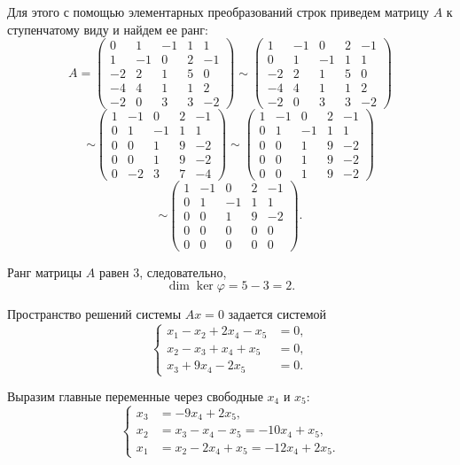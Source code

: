 Для этого с помощью элементарных преобразований строк приведем матрицу $A$ к ступенчатому виду и найдем ее ранг:
\[
A=
\begin{pmatrix}
0 & 1 & -1 & 1 & 1\\
1 & -1 & 0 & 2 & -1\\
-2 & 2 & 1 & 5 & 0\\
-4 & 4 & 1 & 1 & 2\\
-2 & 0 & 3 & 3 & -2
\end{pmatrix}
\sim
\begin{pmatrix}
1 & -1 & 0 & 2 & -1\\
0 & 1 & -1 & 1 & 1\\
-2 & 2 & 1 & 5 & 0\\
-4 & 4 & 1 & 1 & 2\\
-2 & 0 & 3 & 3 & -2
\end{pmatrix}
\]
\[
\sim
\begin{pmatrix}
1 & -1 & 0 & 2 & -1\\
0 & 1 & -1 & 1 & 1\\
0 & 0 & 1 & 9 & -2\\
0 & 0 & 1 & 9 & -2\\
0 & -2 & 3 & 7 & -4
\end{pmatrix}
\sim
\begin{pmatrix}
1 & -1 & 0 & 2 & -1\\
0 & 1 & -1 & 1 & 1\\
0 & 0 & 1 & 9 & -2\\
0 & 0 & 1 & 9 & -2\\
0 & 0 & 1 & 9 & -2
\end{pmatrix}
\]
\[
\sim
\begin{pmatrix}
1 & -1 & 0 & 2 & -1\\
0 & 1 & -1 & 1 & 1\\
0 & 0 & 1 & 9 & -2\\
0 & 0 & 0 & 0 & 0\\
0 & 0 & 0 & 0 & 0
\end{pmatrix}.
\]

Ранг матрицы $A$ равен $3$, следовательно,
\[
\dim\ker\varphi=5-3=2.
\]

Пространство решений системы $Ax=0$ задается системой
\[
\left\{
\begin{aligned}
x_1-x_2+2x_4-x_5&=0,\\
x_2-x_3+x_4+x_5&=0,\\
x_3+9x_4-2x_5&=0.
\end{aligned}
\right.
\]

Выразим главные переменные через свободные $x_4$ и $x_5$:
\[
\left\{
\begin{aligned}
x_3&=-9x_4+2x_5,\\
x_2&=x_3-x_4-x_5=-10x_4+x_5,\\
x_1&=x_2-2x_4+x_5=-12x_4+2x_5.
\end{aligned}
\right.
\]

